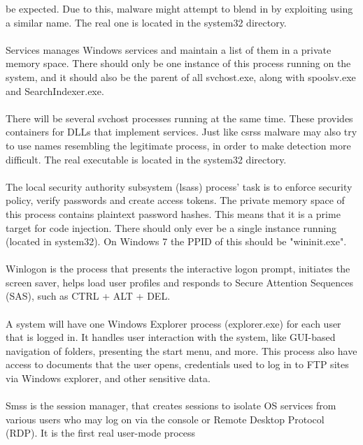 \documentclass[a4paper]{article}
\begin{document}
be expected. Due to this, malware might attempt to blend in by exploiting using a similar name.
The real one is located in the system32 directory. \\ \\
Services manages Windows services and maintain a list of them in a private memory space. There
should only be one instance of this process running on the system, and it should also be the parent
of all svchost.exe, along with spoolsv.exe and SearchIndexer.exe. \\\\
%
There will be several svchost processes running at the same time. These provides containers
for DLLs that implement services. Just like csrss malware may also try to use names resembling
the legitimate process, in order to make detection more difficult. The real executable is located
in the system32 directory. \\\\
%
The local security authority subsystem (lsass) process' task is to enforce security policy, verify
passwords and create access tokens. The private memory space of this process contains plaintext
password hashes. This means that it is a prime target for code injection. There should only ever
be a single instance running (located in system32). On Windows 7 the PPID of this should be
"wininit.exe". \\\\
%
Winlogon is the process that presents the interactive logon prompt, initiates the screen saver,
helps load user profiles and responds to Secure Attention Sequences (SAS), such as CTRL + ALT
+ DEL. \\\\
%
%
A system will have one Windows Explorer process (explorer.exe) for each user that is logged in.
It handles user interaction with the system, like GUI-based navigation of folders, presenting the
start menu, and more. This process also have access to documents that the user opens, credentials
used to log in to FTP sites via Windows explorer, and other sensitive data. \\\\
%
Smss is the session manager, that creates sessions to isolate OS services from various users who may
log on via the console or Remote Desktop Protocol (RDP). It is the first real user-mode process
\end{document}
